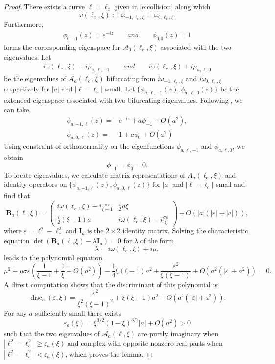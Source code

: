 \documentclass[12pt]{amsart}    %
\renewcommand{\geq}{\geqslant}
\numberwithin{equation}{section}
\begin{document}
\begin{proof}
There exists a curve $\ell=\ell_c$ given in \eqref{e:collision} along which \[\omega(\ell_c,\xi):=\omega_{-1,\ell_c,\xi} =\omega_{0,\ell_c,\xi}.\]
Furthermore,
\begin{align}
 \phi_{0,-1}(z) = e^{-i z}
 \quad \quad and \quad\quad
 \phi_{0,0}(z) = 1
\end{align}
forms the corresponding eigenspace for $\mathcal{A}_0(\ell_c,\xi)$ associated with the two eigenvalues. Let
\begin{align}
    i \omega(\ell_c,\xi) + i \mu_{a,\ell,-1}
    \quad \quad and \quad\quad
    i \omega(\ell_c,\xi) + i \mu_{a,\ell,0}
\end{align}
be the eigenvalues of $\mathcal{A}_a(\ell_c,\xi)$ bifurcating from $i\omega_{-1,\ell_c,\xi}$ and $i\omega_{0,\ell_c,\xi}$ respectively for $|a|$ and $|\ell-\ell_c|$ small. Let $\{\phi_{a,\ell,-1}(z), \phi_{a,\ell,0}(z)\}$ be the extended eigenspace associated with two bifurcating eigenvalues.
Following \cite{Creedon2021High-FrequencyApproach}, we can take,
\begin{align}\label{eq:eigg1}
    \phi_{a,-1,\ell}(z) =& e^{-iz}+a\phi_{-1}+O(a^2), \\
    \phi_{a,0,\ell}(z) =& 1+a\phi_{0}+O(a^2)\label{eq:eigg2}
\end{align}
Using constraint of orthonormality on the eigenfunctions $\phi_{a,\ell,-1}$ and $\phi_{a,\ell,0}$, we obtain
\[
\phi_{-1}=\phi_{0} = 0.
\]
To locate eigenvalues, we calculate matrix representations of $A_a(\ell_c,\xi)$ and identity operators on $\{\phi_{a,-1,\ell}(z), \phi_{a,0,\ell}(z)\}$ for  $|a|$ and $|\ell-\ell_c|$ small  and find that
\[
\mathbf{B}_a(\ell,\xi) = 
\begin{pmatrix}i\omega(\ell_c,\xi)-i\frac{\sigma\varepsilon}{\xi-1}&
\frac i2 a \xi
\\
\frac i2(\xi-1) a&i\omega(\ell_c,\xi)-i\frac{\sigma\varepsilon}{\xi}
\end{pmatrix}+O(|a|(|\varepsilon|+|a|)),
\]
where $\varepsilon=\ell^2-\ell_c^2$ and
$\mathbf{I}_a$ is the $2\times 2$ identity matrix. Solving the characteristic equation $\det(\mathbf{B}_a(\ell,\xi)-\lambda\mathbf{I}_a)=0$ for $\lambda$ of the form
\[
\lambda = i\omega(\ell_c,\xi) +i\mu,
\]
leads to the polynomial equation
\[
\mu^2+\mu\sigma\varepsilon\left(\frac{1}{\xi-1} + \frac{1}{\xi} +
O(a^2)\right)
-\frac14\xi(\xi-1)a^2+\frac{\varepsilon^2}{\xi(\xi-1)} +
  O(a^2(|\varepsilon|+a^2)) =0.
\]
A direct computation shows that the discriminant of this polynomial is
\[
\operatorname{disc}_a(\varepsilon,\xi) = 
\frac{\varepsilon^2}{\xi^2(\xi-1)^2} +\xi(\xi-1)a^2+
O(a^2(|\varepsilon|+a^2)).
\]For any $a$ sufficiently small there exists
\[
\varepsilon_a(\xi) = \xi^{3/2}(1-\xi)^{3/2}|a|+O(a^2)>0
\]
such that the two eigenvalues of $\mathcal A_a(\ell,\xi)$  are purely imaginary when $|\ell^2-\ell_c^2|\geq \varepsilon_a(\xi)$ and complex with opposite nonzero real parts when $|\ell^2-\ell_c^2|<\varepsilon_a(\xi)$, which proves the lemma.
\end{proof}
\end{document}
